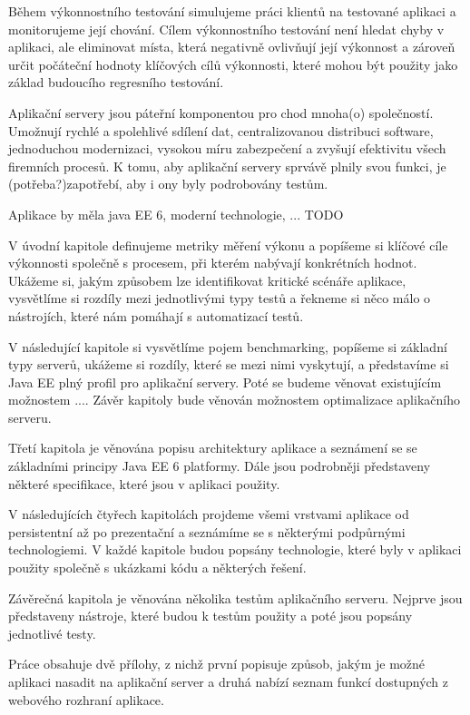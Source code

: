 \documentclass[122pt,oneside]{fithesis}
\begin{document}
Během výkonnostního testování simulujeme práci klientů na testované aplikaci a monitorujeme její chování. Cílem výkonnostního testování není hledat chyby v aplikaci, ale eliminovat místa, která negativně ovlivňují její výkonnost a zároveň určit počáteční hodnoty klíčových cílů výkonnosti, které mohou být použity jako základ budoucího regresního testování.

Aplikační servery jsou páteřní komponentou pro chod mnoha(o) společností. Umožnují rychlé a spolehlivé sdílení dat, centralizovanou distribuci software, jednoduchou modernizaci, vysokou míru zabezpečení a zvyšují efektivitu všech firemních procesů. K tomu, aby aplikační servery sprvávě plnily svou funkci, je (potřeba?)zapotřebí, aby i ony byly podrobovány testům.

Aplikace by měla java EE 6, moderní technologie, ... TODO

V úvodní kapitole definujeme metriky měření výkonu a popíšeme si klíčové cíle výkonnosti společně s procesem, při kterém nabývají konkrétních hodnot. Ukážeme si, jakým způsobem lze identifikovat kritické scénáře aplikace, vysvětlíme si rozdíly mezi jednotlivými typy testů a řekneme si něco málo o nástrojích, které nám pomáhají s automatizací testů.

V následující kapitole si vysvětlíme pojem benchmarking, popíšeme si základní typy serverů, ukážeme si rozdíly, které se mezi nimi vyskytují, a představíme si Java EE plný profil pro aplikační servery. Poté se budeme věnovat existujícím možnostem .... Závěr kapitoly bude věnován možnostem optimalizace aplikačního serveru.

Třetí kapitola je věnována popisu architektury aplikace a seznámení se se základními principy Java EE 6 platformy. Dále jsou podrobněji představeny některé specifikace, které jsou v aplikaci použity.

V následujících čtyřech kapitolách projdeme všemi vrstvami aplikace od persistentní až po prezentační a seznámíme se s některými podpůrnými technologiemi. V každé kapitole budou popsány technologie, které byly v aplikaci použity společně s ukázkami kódu a některých řešení.

Závěrečná kapitola je věnována několika testům aplikačního serveru. Nejprve jsou představeny nástroje, které budou k testům použity a poté jsou popsány jednotlivé testy.

Práce obsahuje dvě přílohy, z nichž první popisuje způsob, jakým je možné aplikaci nasadit na aplikační server a druhá nabízí seznam funkcí dostupných z webového rozhraní aplikace.
\end{document}

